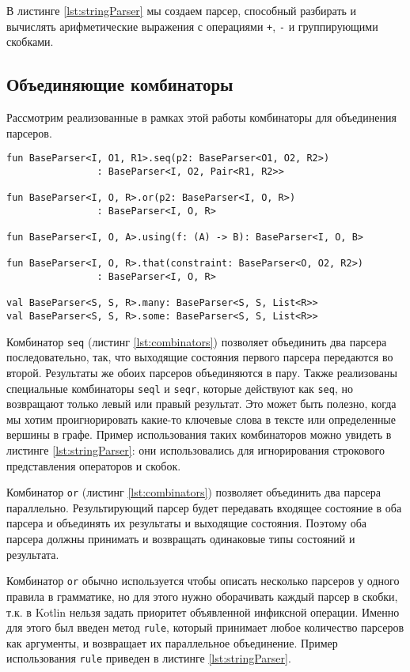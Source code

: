 В листинге \ref{lst:stringParser} мы создаем парсер, способный разбирать и вычислять арифметические выражения с операциями \verb|+|, \verb|-| и группирующими скобками.


\subsection{Объединяющие комбинаторы}

Рассмотрим реализованные в рамках этой работы комбинаторы для объединения парсеров.

\begin{lstlisting}[float=ht, label=lst:combinators, caption=Объединяющие комбинаторы]
fun BaseParser<I, O1, R1>.seq(p2: BaseParser<O1, O2, R2>)
                : BaseParser<I, O2, Pair<R1, R2>>

fun BaseParser<I, O, R>.or(p2: BaseParser<I, O, R>)
                : BaseParser<I, O, R>

fun BaseParser<I, O, A>.using(f: (A) -> B): BaseParser<I, O, B>

fun BaseParser<I, O, R>.that(constraint: BaseParser<O, O2, R2>)
                : BaseParser<I, O, R> 

val BaseParser<S, S, R>.many: BaseParser<S, S, List<R>>
val BaseParser<S, S, R>.some: BaseParser<S, S, List<R>>
\end{lstlisting}

Комбинатор \verb|seq| (листинг \ref{lst:combinators}) позволяет объединить два парсера последовательно, так, что выходящие состояния первого парсера передаются во второй.
Результаты же обоих парсеров объединяются в пару.
Также реализованы специальные комбинаторы \verb|seql| и \verb|seqr|, которые действуют как \verb|seq|, но возвращают только левый или правый результат. Это может быть полезно, когда мы хотим проигнорировать какие-то ключевые слова в тексте или определенные вершины в графе. Пример использования таких комбинаторов можно увидеть в листинге \ref{lst:stringParser}: они использовались для игнорирования строкового представления операторов и скобок.

Комбинатор \verb|or| (листинг \ref{lst:combinators}) позволяет объединить два парсера параллельно.
Результирующий парсер будет передавать входящее состояние в оба парсера и объединять их результаты и выходящие состояния.
Поэтому оба парсера должны принимать и возвращать одинаковые типы состояний и результата.

Комбинатор \verb|or| обычно используется чтобы описать несколько парсеров у одного правила в грамматике, но для этого нужно оборачивать каждый парсер в скобки, т.к. в Kotlin нельзя задать приоритет объявленной инфиксной операции. Именно для этого был введен метод \verb|rule|, который принимает любое количество парсеров как аргументы, и возвращает их параллельное объединение. Пример использования \verb|rule| приведен в листинге \ref{lst:stringParser}.

